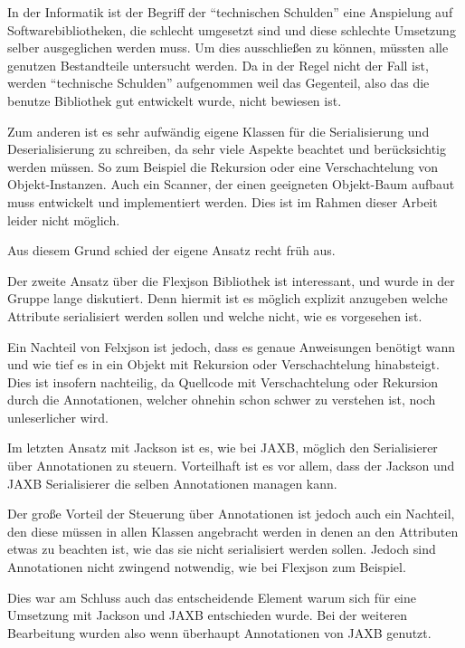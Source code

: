 In der Informatik ist der Begriff der "`technischen Schulden"' eine Anspielung auf Softwarebibliotheken, die schlecht umgesetzt sind und diese schlechte Umsetzung selber ausgeglichen werden muss. Um dies ausschlie\ss{}en zu k\"onnen, m\"ussten alle genutzen Bestandteile untersucht werden. Da in der Regel nicht der Fall ist, werden "`technische Schulden"' aufgenommen weil das Gegenteil, also das die benutze Bibliothek gut entwickelt wurde, nicht bewiesen ist.

Zum anderen ist es sehr aufw\"andig eigene Klassen f\"ur die Serialisierung und Deserialisierung zu schreiben, da sehr viele Aspekte beachtet und ber\"ucksichtig werden m\"ussen. So zum Beispiel die Rekursion oder eine Verschachtelung von Objekt-Instanzen. Auch ein Scanner, der einen geeigneten Objekt-Baum aufbaut muss entwickelt und implementiert werden. Dies ist im Rahmen dieser Arbeit leider nicht m\"oglich.

Aus diesem Grund schied der eigene Ansatz recht fr\"uh aus.

Der zweite Ansatz \"uber die Flexjson Bibliothek ist interessant, und wurde in der Gruppe lange diskutiert. Denn hiermit ist es m\"oglich explizit anzugeben welche Attribute serialisiert werden sollen und welche nicht, wie es vorgesehen ist.

Ein Nachteil von Felxjson ist jedoch, dass es genaue Anweisungen ben\"otigt wann und wie tief es in ein Objekt mit Rekursion oder Verschachtelung hinabsteigt. Dies ist insofern nachteilig, da Quellcode mit Verschachtelung oder Rekursion durch die Annotationen, welcher ohnehin schon schwer zu verstehen ist, noch unleserlicher wird.

Im letzten Ansatz mit Jackson ist es, wie bei \ac{JAXB}, m\"oglich den Serialisierer \"uber Annotationen zu steuern. Vorteilhaft ist es vor allem, dass der Jackson und \ac{JAXB} Serialisierer die selben Annotationen managen kann. 

Der gro\ss{}e Vorteil der Steuerung \"uber Annotationen ist jedoch auch ein Nachteil, den diese m\"ussen in allen Klassen angebracht werden in denen an den Attributen etwas zu beachten ist, wie das sie nicht serialisiert werden sollen. Jedoch sind Annotationen nicht zwingend notwendig, wie bei Flexjson zum Beispiel.

Dies war am Schluss auch das entscheidende Element warum sich f\"ur eine Umsetzung mit Jackson und \ac{JAXB} entschieden wurde. Bei der weiteren Bearbeitung wurden also wenn \"uberhaupt Annotationen von \ac{JAXB} genutzt.

